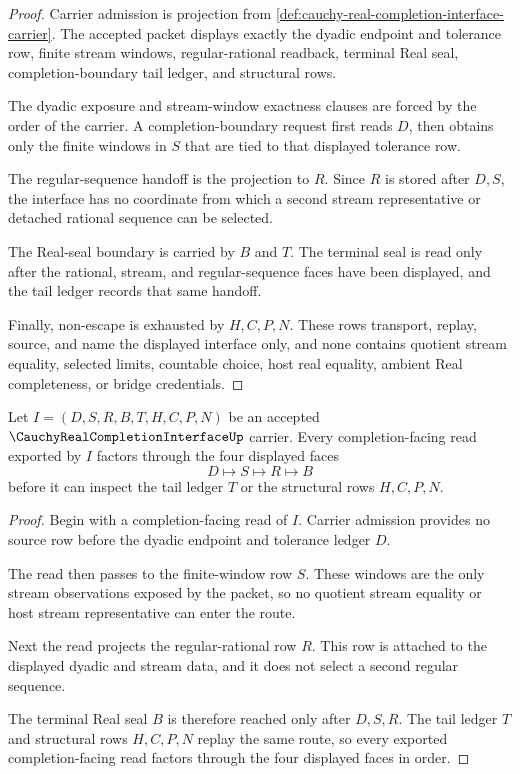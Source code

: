 \begin{proof}
Carrier admission is projection from \autoref{def:cauchy-real-completion-interface-carrier}. The accepted packet displays exactly the dyadic endpoint and tolerance row, finite stream windows, regular-rational readback, terminal Real seal, completion-boundary tail ledger, and structural rows.

The dyadic exposure and stream-window exactness clauses are forced by the order of the carrier. A completion-boundary request first reads $D$, then obtains only the finite windows in $S$ that are tied to that displayed tolerance row.

The regular-sequence handoff is the projection to $R$. Since $R$ is stored after $D,S$, the interface has no coordinate from which a second stream representative or detached rational sequence can be selected.

The Real-seal boundary is carried by $B$ and $T$. The terminal seal is read only after the rational, stream, and regular-sequence faces have been displayed, and the tail ledger records that same handoff.

Finally, non-escape is exhausted by $H,C,P,N$. These rows transport, replay, source, and name the displayed interface only, and none contains quotient stream equality, selected limits, countable choice, host real equality, ambient Real completeness, or bridge credentials.
\end{proof}

\begin{theorem}
\label{thm:cauchy-real-completion-interface-four-face-handoff}
Let $I=(D,S,R,B,T,H,C,P,N)$ be an accepted $\CauchyRealCompletionInterfaceUp$ carrier. Every completion-facing read exported by $I$ factors through the four displayed faces
$$
D \longmapsto S \longmapsto R \longmapsto B
$$
before it can inspect the tail ledger $T$ or the structural rows $H,C,P,N$.
\end{theorem}
\begin{proof}
Begin with a completion-facing read of $I$. Carrier admission provides no source row before the dyadic endpoint and tolerance ledger $D$.

The read then passes to the finite-window row $S$. These windows are the only stream observations exposed by the packet, so no quotient stream equality or host stream representative can enter the route.

Next the read projects the regular-rational row $R$. This row is attached to the displayed dyadic and stream data, and it does not select a second regular sequence.

The terminal Real seal $B$ is therefore reached only after $D,S,R$. The tail ledger $T$ and structural rows $H,C,P,N$ replay the same route, so every exported completion-facing read factors through the four displayed faces in order.
\end{proof}

